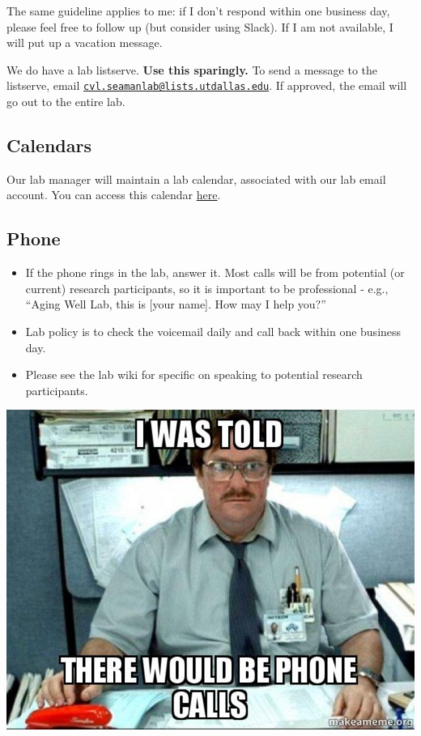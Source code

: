 \documentclass[]{book}
\begin{document}
The same guideline applies to me: if I don't respond within one business day, please feel free to follow up (but consider using Slack). If I am not available, I will put up a vacation message.

We do have a lab listserve. \textbf{Use this sparingly.} To send a message to the listserve, email \href{mailto:cvl.seamanlab@lists.utdallas.edu}{\nolinkurl{cvl.seamanlab@lists.utdallas.edu}}. If approved, the email will go out to the entire lab.

\hypertarget{calendars}{%
\subsection{Calendars}\label{calendars}}

Our lab manager will maintain a lab calendar, associated with our lab email account. You can access this calendar \href{https://calendar.google.com/calendar/embed?src=agingwelllab\%40gmail.com\&ctz=America\%2FNew_York}{here}.

\hypertarget{phone}{%
\subsection{Phone}\label{phone}}

\begin{itemize}
\item
  If the phone rings in the lab, answer it. Most calls will be from potential (or current) research participants, so it is important to be professional - e.g., ``Aging Well Lab, this is {[}your name{]}. How may I help you?''
\item
  Lab policy is to check the voicemail daily and call back within one business day.
\item
  Please see the lab wiki for specific on speaking to potential research participants.
\end{itemize}

\includegraphics{images/phonecalls.jpg}
\end{document}
